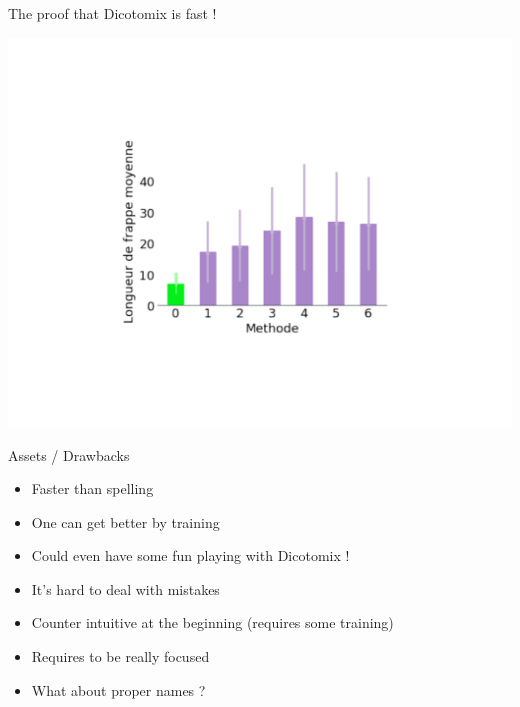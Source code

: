 \documentclass[graphics]{beamer}
\begin{document}
\begin{frame}{The proof that Dicotomix is fast !}
	\begin{center}
		\includegraphics[scale=0.35]{graphe_comparatif.pdf}
	\end{center}
\end{frame}

\begin{frame}{Assets / Drawbacks}
	\begin{tcolorbox}[colback=green!5,colframe=green!40!black,title=Assets]
		\begin{itemize}
			\item Faster than spelling
			\item One can get better by training
			\item Could even have some fun playing with Dicotomix !
		\end{itemize}
	\end{tcolorbox}
	\pause
	\begin{tcolorbox}[colback=red!5,colframe=red!40!black,title=Drawbacks]
		\begin{itemize}
			\item It's hard to deal with mistakes
			\item Counter intuitive at the beginning (requires some training)
			\item Requires to be really focused
			\item What about proper names ?
		\end{itemize}
	\end{tcolorbox}
\end{frame}
\end{document}
